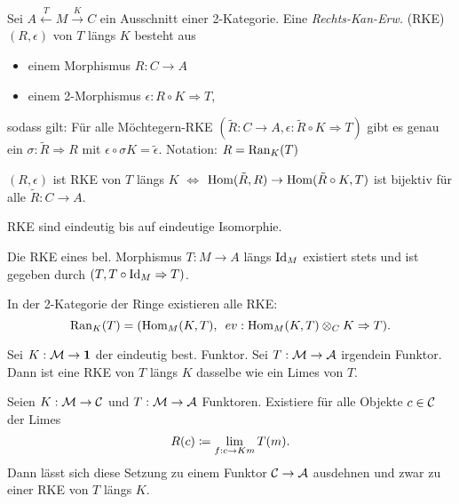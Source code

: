 \documentclass{cheat-sheet}
\begin{document}

\begin{defn}
  Sei $A \xleftarrow{T} M \xrightarrow{K} C$ ein Ausschnitt einer 2-Kategorie. Eine \emph{Rechts-Kan-Erw.} (RKE) $(R, \epsilon)$ von $T$ längs $K$ besteht aus
  \begin{itemize}
    \item einem Morphismus $R : C \to A$
    \item einem 2-Morphismus $\epsilon : R \circ K \Rightarrow T$,
  \end{itemize}
  sodass gilt:
  Für alle Möchtegern-RKE $(\tilde{R} : C \to A, \epsilon : \tilde{R} \circ K \Rightarrow T)$ gibt es genau ein $\sigma : \tilde{R} \Rightarrow R$ mit $\epsilon \circ \sigma K = \tilde{\epsilon}$.
  Notation: $R = \operatorname{Ran}_K(T)$
\end{defn}

\begin{bem}
  $(R, \epsilon)$ ist RKE von $T$ längs $K$ $\iff$ $\operatorname{Hom}(\tilde{R}, R) \to \operatorname{Hom}(\tilde{R} \circ K, T)$ ist bijektiv für alle $\tilde{R} : C \to A$.
\end{bem}

\begin{prop}
  RKE sind eindeutig bis auf eindeutige Isomorphie.
\end{prop}

\begin{bsp}
  Die RKE eines bel. Morphismus $T : M \to A$ längs $\operatorname{Id}_M$ existiert stets und ist gegeben durch $(T, T \circ \operatorname{Id}_M \Rightarrow T)$.
\end{bsp}

\begin{bsp}
  In der 2-Kategorie der Ringe existieren alle RKE:
  \[ \operatorname{Ran}_K(T) = (\operatorname{Hom}_M(K, T), \enspace ev : \operatorname{Hom}_M(K, T) \otimes_C K \Rightarrow T). \]
\end{bsp}

\begin{bsp}
  Sei $K : \mathcal{M} \to \mathbf{1}$ der eindeutig best. Funktor. Sei $T : \mathcal{M} \to \mathcal{A}$ irgendein Funktor. Dann ist eine RKE von $T$ längs $K$ dasselbe wie ein Limes von $T$.
\end{bsp}

\begin{thm}
  Seien $K : \mathcal{M} \to \mathcal{C}$ und $T : \mathcal{M} \to \mathcal{A}$ Funktoren.
  Existiere für alle Objekte $c \in \mathcal{C}$ der Limes
  \[ R(c) \coloneqq \lim_{f : c \to Km} T(m). \]
  Dann lässt sich diese Setzung zu einem Funktor $\mathcal{C} \to \mathcal{A}$ ausdehnen und zwar zu einer RKE von $T$ längs $K$.
\end{thm}
\end{document}
